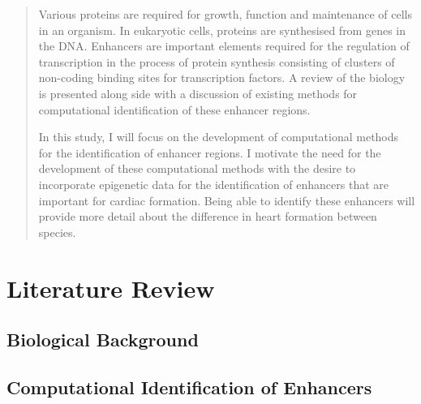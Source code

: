 \documentclass[12pt,a4paper]{article}
\begin{document}
    \tableofcontents
    \listoffigures
 
\listoftables
    \newpage
    \vspace{\fill}
    \begin{abstract}
    Various proteins are required for growth, function and maintenance of cells in an organism. In eukaryotic cells, proteins are synthesised from genes in the DNA. Enhancers are important elements required for the regulation of transcription in the process of protein synthesis consisting of clusters of non-coding binding sites for transcription factors. A review of the biology is presented along side with a discussion of existing methods for computational identification of these enhancer regions. 
    
    In this study, I will focus on the development of computational methods for the identification of enhancer regions. I motivate the need for the development of these computational methods with the desire to incorporate epigenetic data for the identification of enhancers that are important for cardiac formation. Being able to identify these enhancers will provide more detail about the difference in heart formation between species.
    \end{abstract}
    \vspace{\fill}
    \newpage
    \section{Literature Review}
        \subsection{Biological Background}
        
        \subsection{Computational Identification of Enhancers}
        \label{sSec:computational}
         
\end{document}
